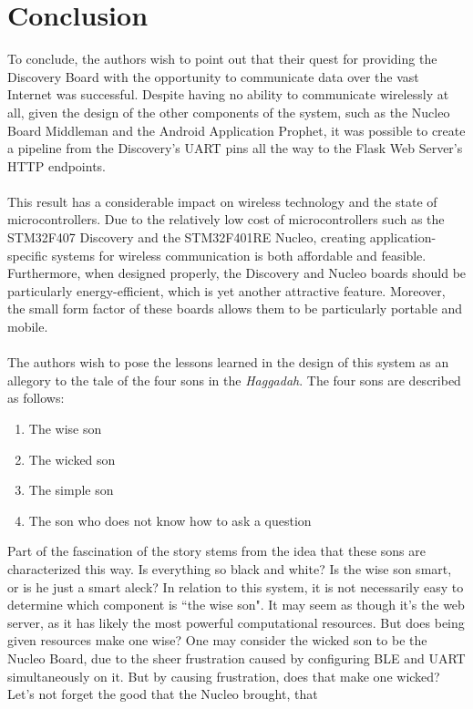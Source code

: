 \section{Conclusion}
To conclude, the authors wish to point out that their quest for providing the Discovery Board with
the opportunity to communicate data over the vast Internet was successful. Despite having no ability
to communicate wirelessly at all, given the design of the other components of the system, such as
the Nucleo Board Middleman and the Android Application Prophet, it was possible to create a pipeline
from the Discovery's UART pins all the way to the Flask Web Server's HTTP endpoints.\\\\
This result has a considerable impact on wireless technology and the state of microcontrollers. Due
to the relatively low cost of microcontrollers such as the STM32F407 Discovery and the STM32F401RE
Nucleo, creating application-specific systems for wireless communication is both affordable and
feasible. Furthermore, when designed properly, the Discovery and Nucleo boards should be
particularly energy-efficient, which is yet another attractive feature. Moreover, the small form
factor of these boards allows them to be particularly portable and mobile.\\\\
The authors wish to pose the lessons learned in the design of this system as an allegory to the tale
of the four sons in the \textit{Haggadah}. The four sons are described as follows:
\begin{enumerate}
	\item The wise son
	\item The wicked son
	\item The simple son
	\item The son who does not know how to ask a question
\end{enumerate}
Part of the fascination of the story stems from the idea that these sons are characterized this way.
Is everything so black and white? Is the wise son smart, or is he just a smart aleck? In relation to
this system, it is not necessarily easy to determine which component is ``the wise son". It may seem
as though it's the web server, as it has likely the most powerful computational resources. But does
being given resources make one wise? One may consider the wicked son to be the Nucleo Board, due to
the sheer frustration caused by configuring BLE and UART simultaneously on it. But by causing
frustration, does that make one wicked? Let's not forget the good that the Nucleo brought, that
